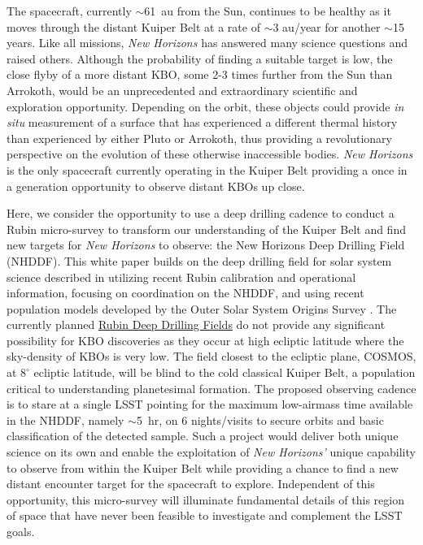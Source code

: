 \documentclass[modern,preprint]{aastex7}
\begin{document}
The spacecraft, currently $\sim$61~au from the Sun, continues to be healthy as it moves through the distant Kuiper Belt at a rate of $\sim$3 au/year for another $\sim$15 years. 
Like all missions, {\it New Horizons} has answered many science questions and raised others. 
Although the probability of finding a suitable target is low, the close flyby of a more distant KBO, some 2-3 times further from the Sun than Arrokoth, would be an unprecedented and extraordinary scientific and exploration opportunity. 
Depending on the orbit, these objects could provide {\it in situ} measurement of a surface that has experienced a different thermal history than experienced by either Pluto or Arrokoth, thus providing a revolutionary perspective on the evolution of these otherwise inaccessible bodies. {\it New Horizons} is the only spacecraft currently operating in the Kuiper Belt providing a once in a generation opportunity to observe distant KBOs up close.

Here, we consider the opportunity to use a deep drilling cadence to conduct a Rubin micro-survey to transform our understanding of the Kuiper Belt and find new targets for {\it New Horizons} to observe: the New Horizons Deep Drilling Field (NHDDF). 
This white paper builds on the deep drilling field for solar system science described in \citet{Trilling18} utilizing recent Rubin calibration and operational information, focusing on coordination on the NHDDF, and using recent population models developed by the Outer Solar System Origins Survey \citep[OSSOS][]{Bannister2018}.
The currently planned \href{https://www.lsst.org/scientists/survey-design/ddf}{Rubin Deep Drilling Fields} do not provide any significant possibility for KBO discoveries as they occur at high ecliptic latitude where the sky-density of KBOs is very low.
The field closest to the ecliptic plane, COSMOS, at $8^\circ$ ecliptic latitude, will be blind to the cold classical Kuiper Belt, a population critical to understanding planetesimal formation.    
The proposed observing cadence is to stare at a single LSST pointing for the maximum low-airmass time available in the NHDDF, namely $\sim$5~hr, on 6 nights/visits to secure orbits and basic classification of the detected sample. 
Such a project would deliver both unique science on its own and enable the exploitation of {\it New Horizons'} unique capability to observe from within the Kuiper Belt while providing a chance to find a new distant encounter target for the spacecraft to explore.
Independent of this opportunity, this micro-survey will illuminate fundamental details of this region of space that have never been feasible to investigate and complement the LSST goals. 
\end{document}
